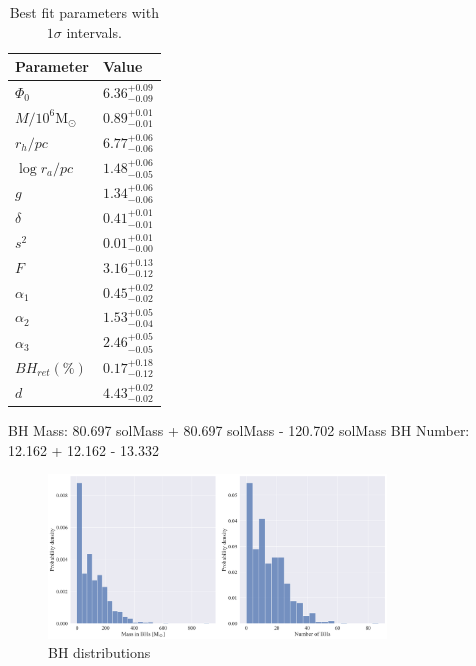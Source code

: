 \begin{table}
	\centering
	\caption{Best fit parameters with $1\sigma$ intervals.}
	\begin{tabular}{l l}

		\hline
		Parameter                 & Value                  \\
		\hline
		$\Phi_0$                  & $6.36^{+0.09}_{-0.09}$ \\
		$M/10^6 \mathrm{M}_\odot$ & $0.89^{+0.01}_{-0.01}$ \\
		$r_h / pc$                & $6.77^{+0.06}_{-0.06}$ \\
		$\log{r_a / pc}$          & $1.48^{+0.06}_{-0.05}$ \\
		$g$                       & $1.34^{+0.06}_{-0.06}$ \\
		$\delta$                  & $0.41^{+0.01}_{-0.01}$ \\
		$s^2$                     & $0.01^{+0.01}_{-0.00}$ \\
		$F$                       & $3.16^{+0.13}_{-0.12}$ \\
		$\alpha_1$                & $0.45^{+0.02}_{-0.02}$ \\
		$\alpha_2$                & $1.53^{+0.05}_{-0.04}$ \\
		$\alpha_3$                & $2.46^{+0.05}_{-0.05}$ \\
		$BH_{ret} (\%)$           & $0.17^{+0.18}_{-0.12}$ \\
		$d$                       & $4.43^{+0.02}_{-0.02}$ \\
		\hline
	\end{tabular}
	\label{tab:parameters_highbin}
\end{table}

BH Mass: 80.697 solMass + 80.697 solMass - 120.702 solMass
BH Number: 12.162 + 12.162 - 13.332


\begin{figure}
	\centering
	\includegraphics[width=0.8\textwidth]{figures/high_bin_model/BH_dists.png}
	\caption{BH distributions}
	\label{fig:high_bin_model_BH_dists}
\end{figure}


